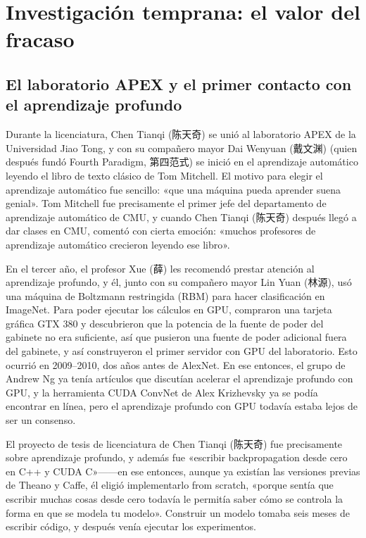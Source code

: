 \section{Investigación temprana: el valor del fracaso}

\subsection{El laboratorio APEX y el primer contacto con el aprendizaje profundo}

Durante la licenciatura, Chen Tianqi (陈天奇) se unió al laboratorio APEX de la Universidad Jiao Tong, y con su compañero mayor Dai Wenyuan (戴文渊) (quien después fundó Fourth Paradigm, 第四范式) se inició en el aprendizaje automático leyendo el libro de texto clásico de Tom Mitchell. El motivo para elegir el aprendizaje automático fue sencillo: «que una máquina pueda aprender suena genial». Tom Mitchell fue precisamente el primer jefe del departamento de aprendizaje automático de CMU, y cuando Chen Tianqi (陈天奇) después llegó a dar clases en CMU, comentó con cierta emoción: «muchos profesores de aprendizaje automático crecieron leyendo ese libro».

En el tercer año, el profesor Xue (薛) les recomendó prestar atención al aprendizaje profundo, y él, junto con su compañero mayor Lin Yuan (林源), usó una máquina de Boltzmann restringida (RBM) para hacer clasificación en ImageNet. Para poder ejecutar los cálculos en GPU, compraron una tarjeta gráfica GTX 380 y descubrieron que la potencia de la fuente de poder del gabinete no era suficiente, así que pusieron una fuente de poder adicional fuera del gabinete, y así construyeron el primer servidor con GPU del laboratorio. Esto ocurrió en 2009--2010, dos años antes de AlexNet. En ese entonces, el grupo de Andrew Ng ya tenía artículos que discutían acelerar el aprendizaje profundo con GPU, y la herramienta CUDA ConvNet de Alex Krizhevsky ya se podía encontrar en línea, pero el aprendizaje profundo con GPU todavía estaba lejos de ser un consenso.

El proyecto de tesis de licenciatura de Chen Tianqi (陈天奇) fue precisamente sobre aprendizaje profundo, y además fue «escribir backpropagation desde cero en C++ y CUDA C»------en ese entonces, aunque ya existían las versiones previas de Theano y Caffe, él eligió implementarlo from scratch, «porque sentía que escribir muchas cosas desde cero todavía le permitía saber cómo se controla la forma en que se modela tu modelo». Construir un modelo tomaba seis meses de escribir código, y después venía ejecutar los experimentos.

